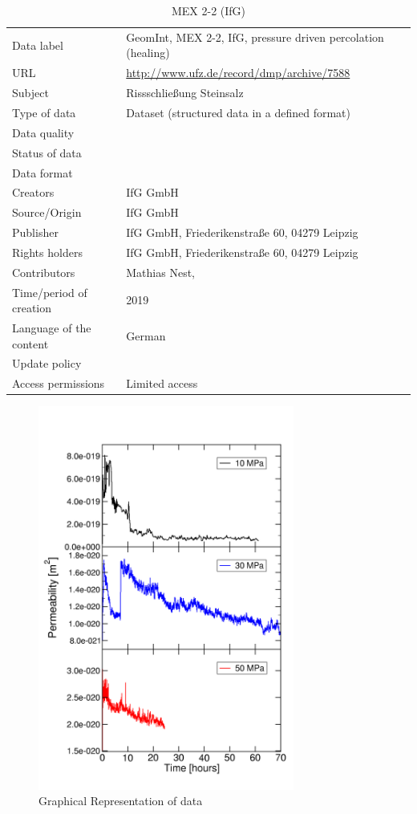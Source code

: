 \begin{table}[!ht]
\caption{MEX 2-2 (IfG)}
\label{tab:dms-mex2-2}
\small
\begin{tabular}{R{3cm}|L{7cm}}
\hline
%
Data label & GeomInt, MEX 2-2, IfG, pressure driven percolation (healing) \\
URL & \url{http://www.ufz.de/record/dmp/archive/7588} \\
Subject  & Rissschlie\ss ung Steinsalz \\
Type of data  & Dataset (structured data in a defined format) \\
Data quality  &  \\
Status of data  &  \\
Data format  & \\
Creators  & IfG GmbH \\
Source/Origin & IfG GmbH \\
Publisher  & IfG GmbH, Friederikenstra\ss e 60, 04279 Leipzig\\
Rights holders & IfG GmbH, Friederikenstra\ss e 60, 04279 Leipzig \\
Contributors & Mathias Nest,  \\
Time/period of creation & 2019 \\
Language of the content & German \\
Update policy &  \\
Access permissions & Limited access \\
%
\hline
\end{tabular}
\end{table}

\begin{figure}[!ht]
\centering
\includegraphics[width=0.75\textwidth]{figures/mex3-perme-time-comparison.png}
\caption{Graphical Representation of data}
\label{fig:dms-mex22-lab}
\end{figure}